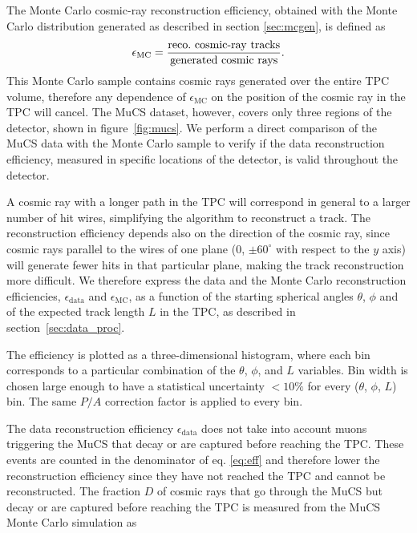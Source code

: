 \documentclass[a4paper,11pt]{article}
\def\myhyphen{{\hbox{-}}}
\begin{document}
The Monte Carlo cosmic-ray reconstruction efficiency, obtained with the Monte Carlo distribution generated as described in section \ref{sec:mcgen}, is defined as
\begin{equation}
  \epsilon_{\mathrm{MC}} = \frac{\mathrm{reco.~cosmic\myhyphen ray~tracks}}{\mathrm{generated~cosmic~rays}}.
\end{equation}
This Monte Carlo sample contains cosmic rays generated over the entire TPC volume, therefore  any dependence of $\epsilon_{\mathrm{MC}}$ on the position of the cosmic ray in the TPC will cancel. The MuCS dataset, however, covers only three regions of the detector, shown in figure~\ref{fig:mucs}. We perform a direct comparison of the MuCS data with the Monte Carlo sample to verify if the data reconstruction efficiency, measured in specific locations of the detector, is valid throughout the detector.

A cosmic ray with a longer path in the TPC will correspond in general to a larger number of hit wires, simplifying the algorithm to reconstruct a track. The reconstruction efficiency depends also on the direction of the cosmic ray, since cosmic rays parallel to the wires of one plane (0, $\pm60^{\circ}$ with respect to the $y$ axis) will generate fewer hits in that particular plane, making the track reconstruction more difficult.
We therefore express the data and the Monte Carlo reconstruction efficiencies, $\epsilon_{\mathrm{data}}$ and $\epsilon_{\mathrm{MC}}$, as a function of the starting spherical angles $\theta$, $\phi$ and of the expected track length $L$ in the TPC, as described in section~\ref{sec:data_proc}.

The efficiency is plotted as a three-dimensional histogram, where each bin corresponds to a particular combination of the $\theta$, $\phi$, and $L$ variables. Bin width is chosen large enough to have a statistical uncertainty $<10\%$ for every ($\theta$, $\phi$, $L$) bin. The same $P/A$ correction factor is applied to every bin.

The data reconstruction efficiency $\epsilon_{\mathrm{data}}$ does not take into account muons triggering the MuCS that decay or are captured before reaching the TPC. These events are counted in the denominator of eq. \eqref{eq:eff} and therefore lower the reconstruction efficiency since they have not reached the TPC and cannot be reconstructed. The fraction $D$ of cosmic rays that go through the MuCS but decay or are captured before reaching the TPC is measured from the MuCS Monte Carlo simulation as
\end{document}
